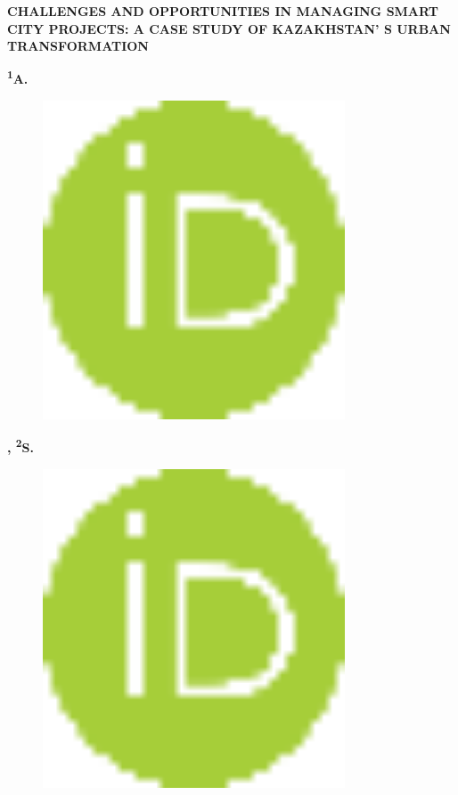
{\bfseries CHALLENGES AND OPPORTUNITIES IN MANAGING SMART CITY PROJECTS: A
CASE STUDY OF KAZAKHSTAN' S URBAN TRANSFORMATION}

{\bfseries \textsuperscript{1}A.
\begin{figure}[H]
	\centering
	\includegraphics[width=0.8\textwidth]{media/ekon2/image10}
	\caption*{}
\end{figure}

{\bfseries , \textsuperscript{2}S.
\begin{figure}[H]
	\centering
	\includegraphics[width=0.8\textwidth]{media/ekon2/image10}
	\caption*{}
\end{figure}

}}
